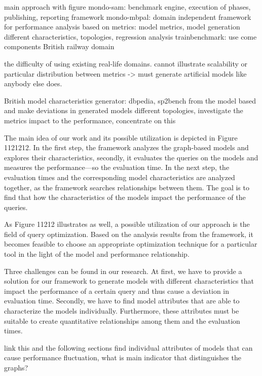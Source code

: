 main approach with figure
mondo-sam: benchmark engine, execution of phases, publishing, reporting framework
mondo-mbpal: domain independent framework for performance analysis based on metrics: model metrics, model generation different characteristics, topologies, regression analysis
trainbenchmark: use come components
British railway domain


the difficulty of using existing real-life domains. cannot illustrate scalability or particular distribution between metrics -> must generate artificial models like anybody else does.

British model characteristics generator: dbpedia, sp2bench
from the model based and make deviations in generated models
different topologies, investigate the metrics impact to the performance, concentrate on this




The main idea of our work and its possible utilization is depicted in Figure 1121212. %
In the first step, the framework analyzes the graph-based models and explores their characteristics, secondly, it evaluates the queries on the models and measures the performance---so the evaluation time. In the next step, the evaluation times and the corresponding model characteristics are analyzed together, as the framework searches relationships between them. The goal is to find that how the characteristics of the models impact the performance of the queries.

As Figure 11212 %
illustrates as well, a possible utilization of our approach is the field of query optimization. Based on the analysis results from the framework, it becomes feasible to choose an appropriate optimization technique for a particular tool in the light of the model and performance relationship.

Three challenges can be found in our research. At first, we have to provide a solution for our framework to generate models with different characteristics that impact the performance of a certain query and thus cause a deviation in evaluation time. Secondly, we have to find model attributes that are able to characterize the models individually. Furthermore, these attributes must be suitable to create quantitative relationships among them and the evaluation times.


link this and the following sections
find individual attributes of models that can cause performance fluctuation, what is main indicator that distinguishes the graphs?

